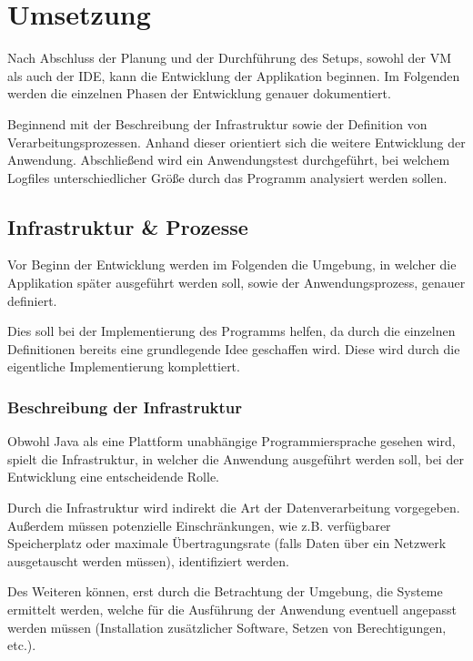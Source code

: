 
\chapter{Umsetzung}\label{cha:Umsetzung}
Nach Abschluss der Planung und der Durchführung des Setups, sowohl der \ac{VM} als auch der \ac{IDE}, kann die Entwicklung der Applikation beginnen. Im Folgenden werden die einzelnen Phasen der Entwicklung genauer dokumentiert.

Beginnend mit der Beschreibung der Infrastruktur sowie der Definition von Verarbeitungsprozessen. Anhand dieser orientiert sich die weitere Entwicklung der Anwendung. Abschließend wird ein Anwendungstest durchgeführt, bei welchem Logfiles unterschiedlicher Größe durch das Programm analysiert werden sollen. 


\section{Infrastruktur \& Prozesse}
Vor Beginn der Entwicklung werden im Folgenden die Umgebung, in welcher die Applikation später ausgeführt werden soll, sowie der Anwendungsprozess, genauer definiert. 

Dies soll bei der Implementierung des Programms helfen, da durch die einzelnen Definitionen bereits eine grundlegende Idee geschaffen wird. Diese wird durch die eigentliche Implementierung komplettiert.

\subsection{Beschreibung der Infrastruktur}\label{subsec:Infrastruktur}
Obwohl Java als eine Plattform unabhängige Programmiersprache gesehen wird, spielt die Infrastruktur, in welcher die Anwendung ausgeführt werden soll, bei der Entwicklung eine entscheidende Rolle.

Durch die Infrastruktur wird indirekt die Art der Datenverarbeitung vorgegeben. Außerdem müssen potenzielle Einschränkungen, wie z.B. verfügbarer Speicherplatz oder maximale Übertragungsrate (falls Daten über ein Netzwerk ausgetauscht werden müssen), identifiziert werden.

Des Weiteren können, erst durch die Betrachtung der Umgebung, die Systeme ermittelt werden, welche für die Ausführung der Anwendung eventuell angepasst werden müssen (Installation zusätzlicher Software, Setzen von Berechtigungen, etc.).

